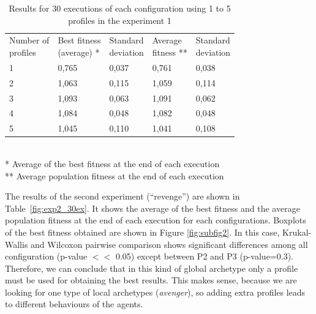 \documentclass[runningheads]{llncs}
\begin{document}
\begin{table}
\begin{center}
\caption{Results for 30 executions of each configuration using 1 to 5 profiles in the experiment 1}
\label{fig:exp1_30ex}

\begin{tabular}{lllll}
\hline\noalign{\smallskip}
\parbox[t]{2cm}{Number of\\ profiles} 
& \parbox[t]{2cm}{Best fitness\\(average) *} 
& \parbox[t]{2cm}{Standard\\deviation}
& \parbox[t]{2cm}{Average\\fitness **}
& \parbox[t]{2cm}{Standard\\deviation}\\
\noalign{\smallskip}
\hline
\noalign{\smallskip}
1 & 0,765 & 0,037 & 0,761 & 0,038 \\
2 & 1,063 & 0,115 & 1,059 & 0,114 \\
3 & 1,093 & 0,063 & 1,091 & 0,062 \\
4 & 1,084 & 0,048 & 1,082 & 0,048 \\
5 & 1,045 & 0,110 & 1,041 & 0,108 \\
\hline
\end{tabular}
\\
\** Average of the best fitness at the end of each execution\\
\*** Average population fitness  at the end of each execution \\
\end{center}
\end{table}


The results of the second experiment (``revenge'') are shown in Table~\ref{fig:exp2_30ex}. It shows the average of the best fitness and the average population fitness at the end of each execution for each configurations. Boxplots of the best fitness obtained are shown in Figure \ref{fig:subfig2}. In this case, Krukal-Wallis and Wilcoxon pairwise comparison shows significant differences among all configuration (p-value $<<$ 0.05) except between P2 and P3 (p-value=0.3). Therefore, we can conclude that in this kind of global archetype only a profile must be used for obtaining the best results. This makes sense, because we are looking for one type of local archetypes ({\em avenger}), so adding extra profiles leads to different behaviours of the agents.
\end{document}
